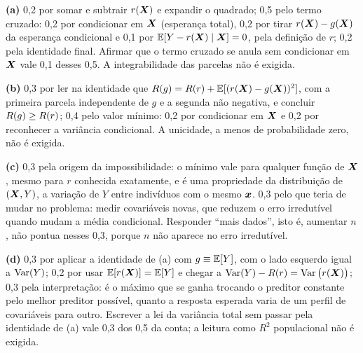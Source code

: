 \documentclass[11pt,a4paper]{article}
\begin{document}



\begin{criterio}
\textbf{(a)} 0,2 por somar e subtrair $r(\bm{X})$ e expandir o quadrado; 0,5 pelo termo
cruzado: 0,2 por condicionar em $\bm{X}$ (esperança total), 0,2 por tirar
$r(\bm{X})-g(\bm{X})$ da esperança condicional e 0,1 por $\mathbb{E}[Y-r(\bm{X})\mid\bm{X}]=0$, pela definição
de $r$; 0,2 pela identidade final. Afirmar que o termo cruzado se anula sem
condicionar em $\bm{X}$ vale 0,1 desses 0,5. A integrabilidade das parcelas não é exigida.

\textbf{(b)} 0,3 por ler na identidade que $R(g)=R(r)+\mathbb{E}[(r(\bm{X})-g(\bm{X}))^2]$,
com a primeira parcela independente de $g$ e a segunda não negativa, e concluir
$R(g)\ge R(r)$; 0,4 pelo valor mínimo: 0,2 por condicionar em $\bm{X}$ e 0,2 por
reconhecer a variância condicional. A unicidade, a menos de probabilidade zero, não é
exigida.

\textbf{(c)} 0,3 pela origem da impossibilidade: o mínimo vale para qualquer função de
$\bm{X}$, mesmo para $r$ conhecida exatamente, e é uma propriedade da distribuição de
$(\bm{X},Y)$, a variação de $Y$ entre indivíduos com o mesmo $\bm{x}$. 0,3 pelo que teria de
mudar no problema: medir covariáveis novas, que reduzem o erro irredutível quando mudam
a média condicional. Responder ``mais dados'', isto é, aumentar $n$, não pontua nesses
0,3, porque $n$ não aparece no erro irredutível.

\textbf{(d)} 0,3 por aplicar a identidade de (a) com $g\equiv\mathbb{E}[Y]$, com o lado esquerdo
igual a $\operatorname{Var}(Y)$; 0,2 por usar $\mathbb{E}[r(\bm{X})]=\mathbb{E}[Y]$ e chegar a
$\operatorname{Var}(Y)-R(r)=\operatorname{Var}\big(r(\bm{X})\big)$; 0,3 pela interpretação: é o máximo que se
ganha trocando o preditor constante pelo melhor preditor possível, quanto a resposta
esperada varia de um perfil de covariáveis para outro. Escrever a lei da variância total
sem passar pela identidade de (a) vale 0,3 dos 0,5 da conta; a leitura como $R^2$
populacional não é exigida.
\end{criterio}
\end{document}
